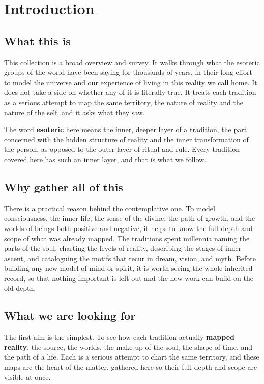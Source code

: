 \chapter*{Introduction}

\section*{What this is}

This collection is a broad overview and survey. It walks through what the esoteric groups of the world have
been saying for thousands of years, in their long effort to model the universe and our experience of living in
this reality we call home. It does not take a side on whether any of it is literally true. It treats each
tradition as a serious attempt to map the same territory, the nature of reality and the nature of the self,
and it asks what they saw.

The word \textbf{esoteric} here means the inner, deeper layer of a tradition, the part concerned with the
hidden structure of reality and the inner transformation of the person, as opposed to the outer layer of
ritual and rule. Every tradition covered here has such an inner layer, and that is what we follow.

\section*{Why gather all of this}

There is a practical reason behind the contemplative one. To model consciousness, the inner life, the sense
of the divine, the path of growth, and the worlds of beings both positive and negative, it helps to know the
full depth and scope of what was already mapped. The traditions spent millennia naming the parts of the soul,
charting the levels of reality, describing the stages of inner ascent, and cataloguing the motifs that recur
in dream, vision, and myth. Before building any new model of mind or spirit, it is worth seeing the whole
inherited record, so that nothing important is left out and the new work can build on the old depth.

\section*{What we are looking for}

The first aim is the simplest. To see how each tradition actually \textbf{mapped reality}, the source, the
worlds, the make-up of the soul, the shape of time, and the path of a life. Each is a serious attempt to chart
the same territory, and these maps are the heart of the matter, gathered here so their full depth and scope
are visible at once.

